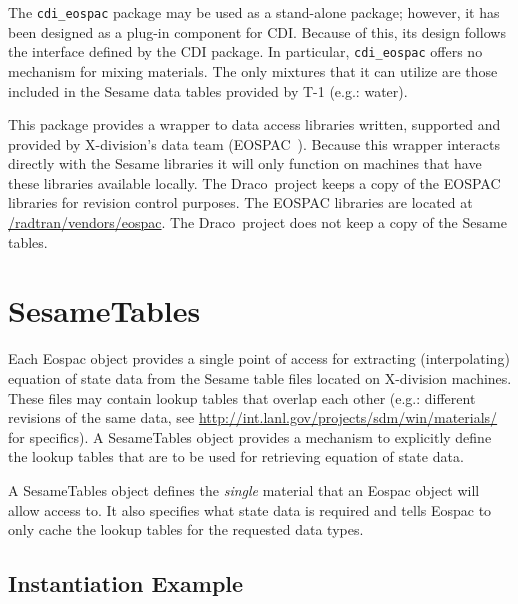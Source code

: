 \documentclass[11pt]{nmemo}
\newcommand{\draco}{{\normalfont\sffamily Draco}}
\begin{document}
The \texttt{cdi\_eospac} package may be used as a stand-alone package;
however, it has been designed as a plug-in component for CDI.  Because
of this, its design follows the interface defined by the CDI package.
In particular, \texttt{cdi\_eospac} offers no mechanism for mixing
materials.  The only mixtures that it can utilize are those included 
in the Sesame data tables provided by T-1 (e.g.: water). 

This package provides a wrapper to data access libraries written,
supported and provided by X-division's data team
(EOSPAC~\cite{eospac-cranfill,eospac-web-site}).  Because this wrapper
interacts directly with the Sesame libraries it will only function on
machines that have these libraries available locally. The \draco\ 
project keeps a copy of the EOSPAC libraries for revision control
purposes.  The EOSPAC libraries are located at
\url{/radtran/vendors/eospac}.  The \draco\ project does not keep a
copy of the Sesame tables.



\section{SesameTables}
\label{SesameTables}

Each Eospac object provides a single point of access for extracting
(interpolating) equation of state data from the Sesame table files
located on X-division machines.  These files may contain lookup
tables that overlap each other (e.g.: different revisions of the same
data, see \url{http://int.lanl.gov/projects/sdm/win/materials/} for
specifics).  A SesameTables object provides a mechanism to explicitly
define the lookup tables that are to be used for retrieving equation
of state data.

A SesameTables object defines the \emph{single} material that an
Eospac object will allow access to.  It also specifies what state data
is required and tells Eospac to only cache the lookup tables for the
requested data types.


\subsection{Instantiation Example}
\end{document}
